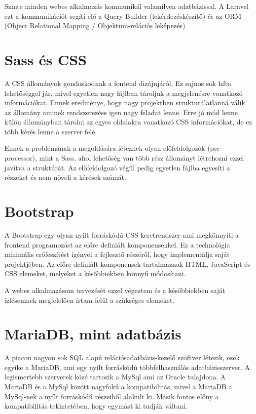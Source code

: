 \documentclass[
]{thesis-ekf}
\theoremstyle{definition}
\theoremstyle{remark}
\begin{document}
Szinte minden webes alkalmazás kommunikál valamilyen adatbázissal. A Laravel ezt a kommunikációt segíti elő a Query Builder (lekérdezéskészítő) és az ORM (Object Relational Mapping / Objektum-relációs leképezés)

\section{Sass és CSS}
A CSS állományok gondoskodnak a fontend dizájnjáról. Ez sajnos sok hiba lehetőséggel jár, mivel egyetlen nagy fájlban tároljuk a megjelenésre vonatkozó információkat. Ennek eredménye, hogy nagy projektben strukturálatlanná válik az állomány aminek rendszerezése igen nagy feladat lenne. Erre jó mód lenne külön állományban tárolni az egyes oldalakra vonatkozó CSS információkat, de ez több kérés lenne a szerver felé. 

Ennek a problémának a megoldására léteznek olyan előfeldolgozók (pre-processor), mint a Sass, ahol lehetőség van több rész állományt létrehozni ezzel javítva a struktúrát. Az előfeldolgozó végül pedig egyetlen fájlba egyesíti a részeket és nem növeli a kérések számát. 

\section{Bootstrap}
A Bootstrap egy olyan nyílt forráskódú CSS keretrendszer ami megkönnyíti a frontend programozást az előre definiált komponensekkel. Ez a technológia minimális erőfeszítést igényel a fejlesztő részéről, hogy implementálja saját projektjében. Az előre definiált komponensek tartalmaznak HTML, JavaScript és CSS elemeket, melyeket a későbbiekben könnyű módosítani.

A webes alkalmazásom tervezését ezzel végeztem és a későbbiekben saját ízlésemnek megfelelően írtam felül a szükséges elemeket. 

\section{MariaDB, mint adatbázis}
A piacon nagyon sok SQL alapú relációsadatbázis-kezelő szoftver létezik, ezek egyike a MariaDB, ami egy nyílt forráskódú többfelhasználós adatbázisszerver. A legismertebb szerverek közé tartozik a MySql ami az Oracle tulajdona. A MariaDB és a MySql között nagyfokú a kompatibilitás, mivel a MariaDB a MySql-nek a nyílt forráskódú részeiből alakult ki. Másik fontos előny a kompatibilitás tekintetében, hogy egymást ki tudják váltani.
\end{document}
